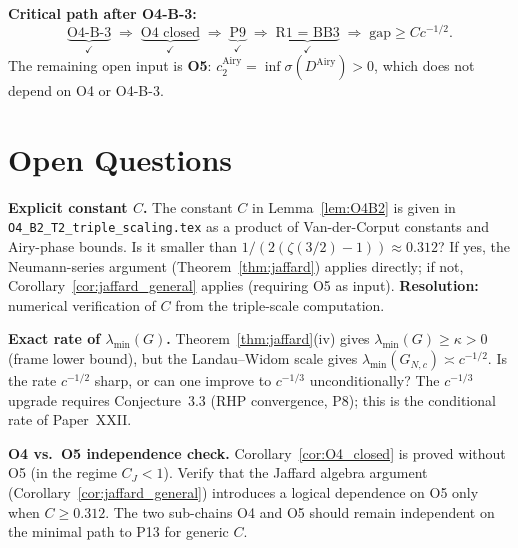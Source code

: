 \documentclass[12pt,a4paper]{amsart}
\theoremstyle{definition}
\newcommand{\lmin}{\lambda_{\min}}
\newcommand{\CJ}{C_J}
\begin{document}
\medskip
\noindent
\textbf{Critical path after O4-B-3:}
\[
  \underbrace{\text{O4-B-3}}_{\checkmark}
  \;\Rightarrow\;
  \underbrace{\text{O4 closed}}_{\checkmark}
  \;\Rightarrow\;
  \underbrace{\text{P9}}_{\checkmark}
  \;\Rightarrow\;
  \underbrace{\text{R1 = BB3}}_{\checkmark}
  \;\Rightarrow\;
  \text{gap} \ge C c^{-1/2}.
\]
The remaining open input is \textbf{O5}:
$c_2^{\mathrm{Airy}} = \inf\sigma(D^{\mathrm{Airy}}) > 0$,
which does not depend on O4 or O4-B-3.

\section{Open Questions}
\label{sec:open}

\begin{enumerate}[label={[O-B3-\arabic*]},ref={O-B3-\arabic*}]

\item\label{oq:C_explicit}
\textbf{Explicit constant $C$.}
The constant $C$ in Lemma~\ref{lem:O4B2} is given in
\texttt{O4\_B2\_T2\_triple\_scaling.tex} as a product of
Van-der-Corput constants and Airy-phase bounds.
Is it smaller than $1/(2(\zeta(3/2)-1)) \approx 0.312$?
If yes, the Neumann-series argument (Theorem~\ref{thm:jaffard}) applies directly;
if not, Corollary~\ref{cor:jaffard_general} applies (requiring O5 as input).
\textbf{Resolution:} numerical verification of $C$ from the triple-scale computation.

\item\label{oq:lmin_rate}
\textbf{Exact rate of $\lmin(G)$.}
Theorem~\ref{thm:jaffard}(iv) gives $\lmin(G) \ge \kappa > 0$ (frame lower bound),
but the Landau--Widom scale gives $\lmin(G_{N,c}) \asymp c^{-1/2}$.
Is the rate $c^{-1/2}$ sharp, or can one improve to $c^{-1/3}$ unconditionally?
The $c^{-1/3}$ upgrade requires Conjecture~3.3 (RHP convergence, P8);
this is the conditional rate of Paper~XXII.

\item\label{oq:O5_independence}
\textbf{O4 vs.\ O5 independence check.}
Corollary~\ref{cor:O4_closed} is proved without O5 (in the regime $\CJ < 1$).
Verify that the Jaffard algebra argument (Corollary~\ref{cor:jaffard_general})
introduces a logical dependence on O5 only when $C \ge 0.312$.
The two sub-chains O4 and O5 should remain independent on the minimal path
to P13 for generic $C$.

\end{enumerate}
\end{document}
